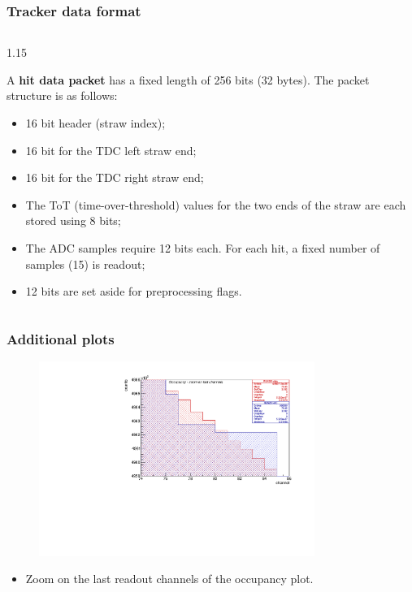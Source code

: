 \documentclass{beamer}
\begin{document}
\begin{frame}
    \frametitle{Tracker data format}
    \begin{columns}
        \begin{column}{1.15\framewidth}
    \setlength{\leftmargini}{1.em}

    A \textbf{hit data packet} has
    a fixed length of 256 bits (32 bytes).
    The packet structure is as follows:
    \vspace{2mm}
    \begin{itemize}
        \item 16 bit header (straw index);
        \vspace{1mm}
        \item 16 bit for the TDC left straw end;
        \vspace{1mm}
        \item 16 bit for the TDC right straw end;
        \vspace{1mm}
        \item The ToT (time-over-threshold) values for the two ends 
        of the straw are each stored using 8 bits;
        \vspace{1mm}
        \item The ADC samples require 12 bits each. For each hit, a fixed number of 
        samples (15) is readout;
        \vspace{1mm}
        \item 12 bits are set aside for preprocessing flags.
    \end{itemize}
\end{column}
\end{columns}
    \end{frame}

\begin{frame}
    \frametitle{Additional plots}
    \begin{figure}[!h]
        \centering
        \includegraphics[width =0.8\textwidth]{figures/pdf/figure_00014_nhitsvschannel_roc_simulation_281.pdf}
        \label{fig:anglesinmuon}
    \end{figure}
    \begin{itemize}
        \item Zoom on the last readout channels of the occupancy plot.
    \end{itemize}
\end{frame}
\end{document}
